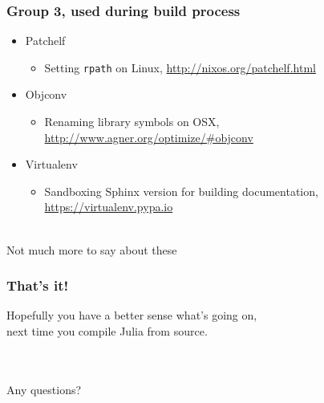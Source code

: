 \documentclass[compressed,dvips,letter]{beamer}
\begin{document}
%
%

\begin{frame}\frametitle{Group 3, used during build process}
\begin{itemize}
\item Patchelf
\begin{itemize}
\item Setting \texttt{rpath} on Linux, \url{http://nixos.org/patchelf.html}
\end{itemize}
\item Objconv
\begin{itemize}
\item Renaming library symbols on OSX, \url{http://www.agner.org/optimize/\#objconv}
\end{itemize}
\item Virtualenv
\begin{itemize}
\item Sandboxing Sphinx version for building documentation, \url{https://virtualenv.pypa.io}
\end{itemize}
\end{itemize}

~\\
Not much more to say about these

\end{frame}

%
%

\begin{frame}\frametitle{That's it!}

\begin{center}
Hopefully you have a better sense what's going on, \\
next time you compile Julia from source.

~\\
~\\

Any questions?
\end{center}

\end{frame}
\end{document}
